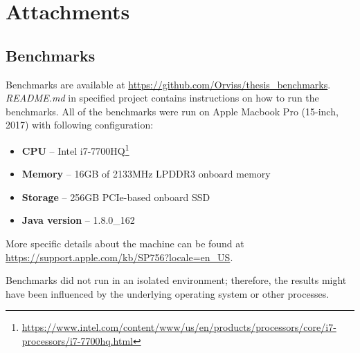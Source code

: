 \chapter{Attachments}

\section{Benchmarks}
\label{benchmark_attachment}

Benchmarks are available at \url{https://github.com/Orviss/thesis_benchmarks}. \textit{README.md} in specified project
contains instructions on how to run the benchmarks. All of the benchmarks were run on Apple Macbook Pro (15-inch, 2017)
with following configuration:
\begin{itemize}
    \item \textbf{CPU} – Intel i7-7700HQ\footnote{\url{https://www.intel.com/content/www/us/en/products/processors/core/i7-processors/i7-7700hq.html}}
    \item \textbf{Memory} – 16GB of 2133MHz LPDDR3 onboard memory
    \item \textbf{Storage} – 256GB PCIe-based onboard SSD
    \item \textbf{Java version} – 1.8.0\_162
\end{itemize}

More specific details about the machine can be found at \url{https://support.apple.com/kb/SP756?locale=en_US}.

Benchmarks did not run in an isolated environment; therefore, the results might have been influenced by the underlying
operating system or other processes.